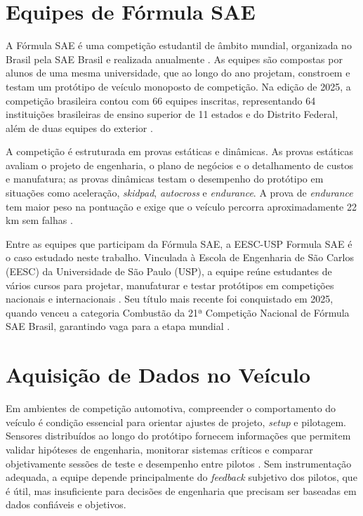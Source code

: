 \section{Equipes de Fórmula SAE}

A Fórmula SAE é uma competição estudantil de âmbito mundial, organizada no Brasil
pela SAE Brasil e realizada anualmente \cite{sae_brasil_formula_sae}. As equipes
são compostas por alunos de uma mesma universidade, que ao longo do ano projetam,
constroem e testam um protótipo de veículo monoposto de competição. Na edição de
2025, a competição brasileira contou com 66 equipes inscritas, representando 64
instituições brasileiras de ensino superior de 11 estados e do Distrito Federal,
além de duas equipes do exterior \cite{sae_brasil_formula_sae_2025_inscritos}.

A competição é estruturada em provas estáticas e dinâmicas. As provas estáticas
avaliam o projeto de engenharia, o plano de negócios e o detalhamento de custos e
manufatura; as provas dinâmicas testam o desempenho do protótipo em situações como
aceleração, \emph{skidpad}, \emph{autocross} e \emph{endurance}. A prova de \emph{endurance} tem maior peso na
pontuação e exige que o veículo percorra aproximadamente 22 km sem falhas
\cite{fsaeonline_endurance_2026}.

Entre as equipes que participam da Fórmula SAE, a EESC-USP Formula SAE é o caso
estudado neste trabalho. Vinculada à Escola de Engenharia de São Carlos (EESC) da
Universidade de São Paulo (USP), a equipe reúne estudantes de vários cursos para
projetar, manufaturar e testar protótipos em competições nacionais e
internacionais \cite{eesc_usp_formula_sae_e22_2025}. Seu título mais recente foi
conquistado em 2025, quando venceu a categoria Combustão da 21ª Competição
Nacional de Fórmula SAE Brasil, garantindo vaga para a etapa mundial
\cite{eesc_usp_formula_sae_2025,sae_brasil_resultados_combustao_2025}.

\section{Aquisição de Dados no Veículo}

Em ambientes de competição automotiva, compreender o comportamento do veículo é
condição essencial para orientar ajustes de projeto, \emph{setup} e pilotagem. Sensores
distribuídos ao longo do protótipo fornecem informações que permitem validar
hipóteses de engenharia, monitorar sistemas críticos e comparar objetivamente
sessões de teste e desempenho entre pilotos
\cite{schultz2017_formula_sae_telemetry,ashford2020_formula_sae_data_analysis}.
Sem instrumentação adequada, a equipe depende principalmente do \emph{feedback} subjetivo
dos pilotos, que é útil, mas insuficiente para decisões de engenharia que precisam ser baseadas em dados confiáveis e
objetivos.

